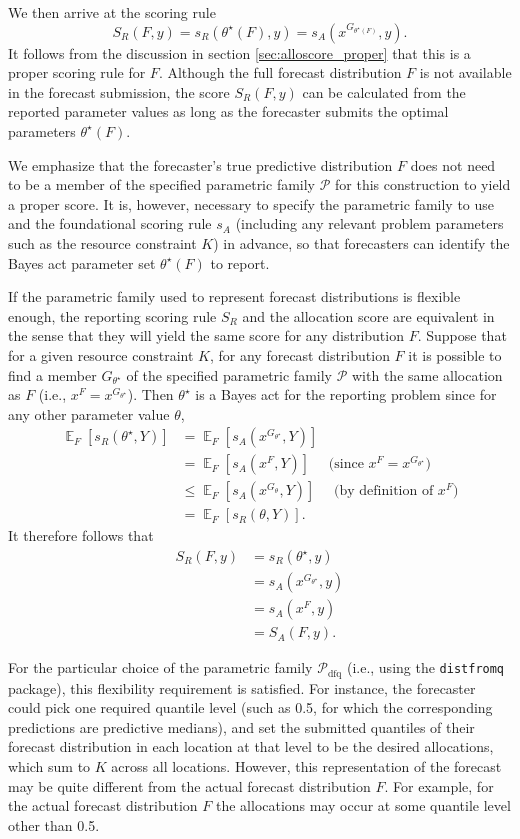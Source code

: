 \documentclass{article}
\DeclareMathOperator{\Ex}{\mathbb{E}}
\begin{document}
We then arrive at the scoring rule
$$S_R(F, y) = s_R(\theta^\star(F), y) = s_A(x^{G_{\theta^\star(F)}}, y).$$
It follows from the discussion in section \ref{sec:alloscore_proper} that this is a proper scoring rule for $F$.
Although the full forecast distribution $F$ is not available in the forecast submission, the score $S_R(F, y)$ can be calculated from the reported parameter values as long as the forecaster submits the optimal parameters $\theta^\star(F)$.

We emphasize that the forecaster's true predictive distribution $F$ does not need to be a member of the specified parametric family $\mathcal{P}$ for this construction to yield a proper score.
It is, however, necessary to specify the parametric family to use and the foundational scoring rule $s_A$ (including any relevant problem parameters such as the resource constraint $K$) in advance, so that forecasters can identify the Bayes act parameter set $\theta^\star(F)$ to report.

If the parametric family used to represent forecast distributions is flexible enough, the reporting scoring rule $S_R$ and the allocation score are equivalent in the sense that they will yield the same score for any distribution $F$.
Suppose that for a given resource constraint $K$, for any forecast distribution $F$ it is possible to find a member $G_{\theta^\star}$ of the specified parametric family $\mathcal{P}$ with the same allocation as $F$ (i.e., $x^F = x^{G_{\theta^\star}}$). Then $\theta^\star$ is a Bayes act for the reporting problem since for any other parameter value $\theta$,
\begin{align*}
\Ex_F[s_R(\theta^\star, Y)] &= \Ex_F[ s_A(x^{G_{\theta^\star}}, Y) ] \\
&= \Ex_F[s_A(x^F, Y)]  \quad \text{ (since $x^F = x^{G_{\theta^\star}}$)} \\
&\leq \Ex_F[ s_A(x^{G_\theta}, Y) ]  \quad \text{ (by definition of $x^F$)} \\
&= \Ex_F[ s_R(\theta, Y)].
\end{align*}
It therefore follows that
\begin{align*}
S_R(F, y) &= s_R(\theta^\star, y) \\
&= s_A(x^{G_{\theta^\star}}, y) \\
&= s_A(x^F, y) \\
&= S_A(F, y).
\end{align*}

For the particular choice of the parametric family $\mathcal{P}_{\text{dfq}}$ (i.e., using the \verb`distfromq` package), this flexibility requirement is satisfied. For instance, the forecaster could pick one required quantile level (such as 0.5, for which the corresponding predictions are predictive medians), and set the submitted quantiles of their forecast distribution in each location at that level to be the desired allocations, which sum to $K$ across all locations.
However, this representation of the forecast may be quite different from the actual forecast distribution $F$.
For example, for the actual forecast distribution $F$ the allocations may occur at some quantile level other than 0.5.
\end{document}
